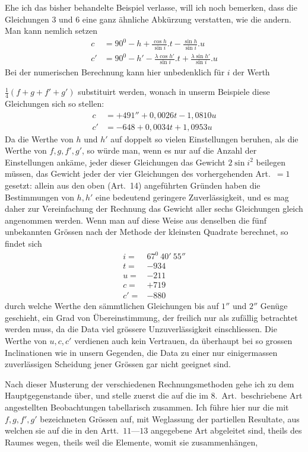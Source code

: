 Ehe ich das bisher behandelte Beispiel verlasse, will ich noch bemerken, dass die Gleichungen $3$ und $6$ eine ganz ähnliche Abkürzung verstatten, wie die andern. Man kann nemlich setzen
\[
\begin{aligned}
c&=90^0-h+\frac{\cos h}{\sin i}.t-\frac{\sin h}{\sin i}.u\\
c'&=90^0-h'-\frac{\lambda\cos h'}{\sin i}.t+\frac{\lambda\sin h'}{\sin i}.u
\end{aligned}
\]
Bei der numerischen Berechnung kann hier unbedenklich für $i$ der Werth
\par\clearpage
{}
\noindent $\frac14(f+g+f'+g')$ substituirt werden, wonach in unserm Beispiele diese Gleichungen sich so stellen:
\[
\begin{aligned}
c&=+491''+0{,}0026t-1{,}0810u\\
c'&=-648+0{,}0034t+1{,}0953u
\end{aligned}
\]
Da die Werthe von $h$ und $h'$ auf doppelt so vielen Einstellungen beruhen, als die Werthe von $f,g,f',g'$, so würde man, wenn es nur auf die Anzahl der Einstellungen ankäme, jeder dieser Gleichungen das Gewicht $2\sin i^2$ beilegen müssen, das Gewicht jeder der vier Gleichungen des vorhergehenden Art.\ $=1$ gesetzt: allein aus den oben (Art.\ 14) angeführten Gründen haben die Bestimmungen von $h,h'$ eine bedeutend geringere Zuverlässigkeit, und es mag daher zur Vereinfachung der Rechnung das Gewicht aller sechs Gleichungen gleich angenommen werden. Wenn man auf diese Weise aus denselben die fünf unbekannten Grössen nach der Methode der kleinsten Quadrate berechnet, so findet sich
\[
\begin{array}{rl}
i=&67^0\ 40'\ 55''\\
t=&-934\\
u=&-211\\
c=&+719\\
c'=&-880
\end{array}
\]
durch welche Werthe den sämmtlichen Gleichungen bis auf $1''$ und $2''$ Genüge geschieht, ein Grad von Übereinstimmung, der freilich nur als zufällig betrachtet werden muss, da die Data viel grössere Unzuverlässigkeit einschliessen. Die Werthe von $u,c,c'$ verdienen auch kein Vertrauen, da überhaupt bei so grossen Inclinationen wie in unsern Gegenden, die Data zu einer nur einigermassen zuverlässigen Scheidung jener Grössen gar nicht geeignet sind.

Nach dieser Musterung der verschiedenen Rechnungsmethoden gehe ich zu dem Hauptgegenstande über, und stelle zuerst die auf die im 8.\ Art.\ beschriebene Art angestellten Beobachtungen tabellarisch zusammen. Ich führe hier nur die mit $f,g,f',g'$ bezeichneten Grössen auf, mit Weglassung der partiellen Resultate, aus welchen sie auf die in den Artt.\ $11$---$13$ angegebene Art abgeleitet sind, theils des Raumes wegen, theils weil die Elemente, womit sie zusammenhängen,
\par\GaussVSourceGathering{60\textsuperscript{*}}
